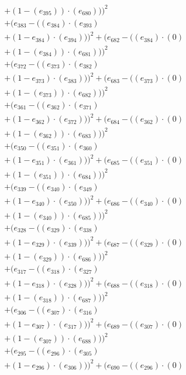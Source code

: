 \documentclass[10pt, a4paper]{article}
\begin{document}
\begin{align*}
& + (1 - (e_{395})) \cdot (e_{680})))^{2} \\
& + (e_{383} - ((e_{384})  \cdot  (e_{393}) \\
& + (1 - e_{384})  \cdot  (e_{394})))^{2} + (e_{682} - ((e_{384}) \cdot (0) \\
& + (1 - (e_{384})) \cdot (e_{681})))^{2} \\
& + (e_{372} - ((e_{373})  \cdot  (e_{382}) \\
& + (1 - e_{373})  \cdot  (e_{383})))^{2} + (e_{683} - ((e_{373}) \cdot (0) \\
& + (1 - (e_{373})) \cdot (e_{682})))^{2} \\
& + (e_{361} - ((e_{362})  \cdot  (e_{371}) \\
& + (1 - e_{362})  \cdot  (e_{372})))^{2} + (e_{684} - ((e_{362}) \cdot (0) \\
& + (1 - (e_{362})) \cdot (e_{683})))^{2} \\
& + (e_{350} - ((e_{351})  \cdot  (e_{360}) \\
& + (1 - e_{351})  \cdot  (e_{361})))^{2} + (e_{685} - ((e_{351}) \cdot (0) \\
& + (1 - (e_{351})) \cdot (e_{684})))^{2} \\
& + (e_{339} - ((e_{340})  \cdot  (e_{349}) \\
& + (1 - e_{340})  \cdot  (e_{350})))^{2} + (e_{686} - ((e_{340}) \cdot (0) \\
& + (1 - (e_{340})) \cdot (e_{685})))^{2} \\
& + (e_{328} - ((e_{329})  \cdot  (e_{338}) \\
& + (1 - e_{329})  \cdot  (e_{339})))^{2} + (e_{687} - ((e_{329}) \cdot (0) \\
& + (1 - (e_{329})) \cdot (e_{686})))^{2} \\
& + (e_{317} - ((e_{318})  \cdot  (e_{327}) \\
& + (1 - e_{318})  \cdot  (e_{328})))^{2} + (e_{688} - ((e_{318}) \cdot (0) \\
& + (1 - (e_{318})) \cdot (e_{687})))^{2} \\
& + (e_{306} - ((e_{307})  \cdot  (e_{316}) \\
& + (1 - e_{307})  \cdot  (e_{317})))^{2} + (e_{689} - ((e_{307}) \cdot (0) \\
& + (1 - (e_{307})) \cdot (e_{688})))^{2} \\
& + (e_{295} - ((e_{296})  \cdot  (e_{305}) \\
& + (1 - e_{296})  \cdot  (e_{306})))^{2} + (e_{690} - ((e_{296}) \cdot (0) \\

\end{align*}
\end{document}
